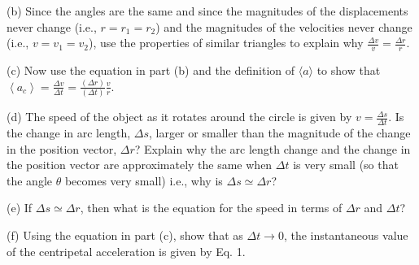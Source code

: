 (b) Since the angles are the same and since the magnitudes of the displacements
never change (i.e., $r= r_{1}  = r_{2} $) and the magnitudes of the
velocities never change (i.e., $v = v_{1} = v_{2} $), use the properties
of similar triangles to explain why \( \frac{\Delta v}{v}=\frac{\Delta r}{r} \).
\vspace{20mm}

(c) Now use the equation in part (b) and the definition of $\langle
a\rangle$ to show that
\( \left\langle a_{c}\right\rangle =\frac{\Delta v}{\Delta t}=\frac{\left( \Delta r\right) }{\left( \Delta t\right) }\frac{v}{r}. \)
\vspace{20mm}

(d) The speed of the object as it rotates around the circle is given by \( v=\frac{\Delta s}{\Delta t} \).
Is the change in arc length, \( \Delta  s\), larger or smaller than the magnitude
of the change in the position vector, \( \Delta  r\)? Explain why the arc length
change and the change in the position vector are approximately the same when
$\Delta t$ is very small (so that the angle $\theta$ 
becomes very small) i.e., why is \( \Delta  s
\simeq  \Delta  r\)?
\vspace{20mm}

(e) If \( \Delta  s  \simeq   \Delta  r\), then what is the equation
for the speed in terms of \( \Delta  r\) and \( \Delta  t\)?
\vspace{20mm}

(f) Using the equation in part (c), show that as \( \Delta  t\rightarrow 0 \), 
the instantaneous value of the centripetal acceleration is given by Eq. 1.

